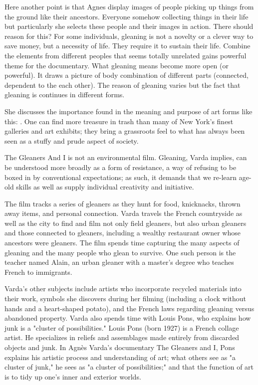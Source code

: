 Here another point is that Agnes display images of people picking up things from the ground like their ancestors. Everyone somehow collecting things in their life but particularly she selects these people and their images in action. There should reason for this? For some individuals, gleaning is not a novelty or a clever way to save money, but a necessity of life. They require it to sustain their life. Combine the elements from different peoples that seems totally unrelated gains powerful theme for the documentary. What gleaning means become more open (or powerful). It draws a picture of body combination of different parts (connected, dependent to the each other). The reason of gleaning varies but the fact that gleaning is continues in different forms.

She discusses the importance found in the meaning and purpose of art forms like this:  \cite{cruickshank2007work}. One can find more treasure in trash than many of New York’s finest galleries and art exhibits; they bring a grassroots feel to what has always been seen as a stuffy and prude aspect of society.

The Gleaners And I is not an environmental film. Gleaning, Varda implies, can be understood more broadly as a form of resistance, a way of refusing to be boxed in by conventional expectations; as such, it demands that we re-learn age-old skills as well as supply individual creativity and initiative.

The film tracks a series of gleaners as they hunt for food, knicknacks, thrown away items, and personal connection. Varda travels the French countryside as well as the city to find and film not only field gleaners, but also urban gleaners and those connected to gleaners, including a wealthy restaurant owner whose ancestors were gleaners. The film spends time capturing the many aspects of gleaning and the many people who glean to survive. One such person is the teacher named Alain, an urban gleaner with a master's degree who teaches French to immigrants.

Varda's other subjects include artists who incorporate recycled materials into their work, symbols she discovers during her filming (including a clock without hands and a heart-shaped potato), and the French laws regarding gleaning versus abandoned property. Varda also spends time with Louis Pons, who explains how junk is a "cluster of possibilities." Louis Pons (born 1927) is a French collage artist. He specializes in reliefs and assemblages made entirely from discarded objects and junk. In Agnès Varda's documentary The Gleaners and I, Pons explains his artistic process and understanding of art; what others see as "a cluster of junk," he sees as "a cluster of possibilities;" and that the function of art is to tidy up one's inner and exterior worlds.

